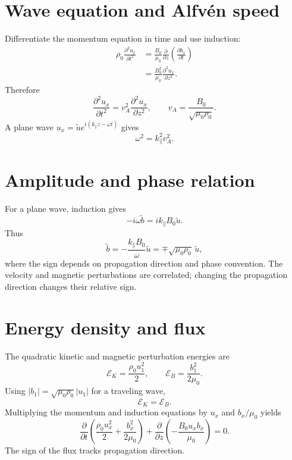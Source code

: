 \documentclass[11pt]{article}
\begin{document}
\section{Wave equation and Alfvén speed}

Differentiate the momentum equation in time and use induction:
\begin{align}
\rho_0\frac{\partial^2u_x}{\partial t^2}
&=\frac{B_0}{\mu_0}\frac{\partial}{\partial z}
\left(\frac{\partial b_x}{\partial t}\right)\\
&=\frac{B_0^2}{\mu_0}\frac{\partial^2u_x}{\partial z^2}.
\end{align}
Therefore
\begin{equation}
\boxed{\frac{\partial^2u_x}{\partial t^2}
=v_A^2\frac{\partial^2u_x}{\partial z^2}},
\qquad
\boxed{v_A=\frac{B_0}{\sqrt{\mu_0\rho_0}}}.
\end{equation}
A plane wave $u_x=\tilde u e^{i(k_\parallel z-\omega t)}$ gives
\begin{equation}
\boxed{\omega^2=k_\parallel^2v_A^2}.
\end{equation}


\section{Amplitude and phase relation}

For a plane wave, induction gives
\begin{equation}
-i\omega\tilde b=ik_\parallel B_0\tilde u.
\end{equation}
Thus
\begin{equation}
\tilde b=-\frac{k_\parallel B_0}{\omega}\tilde u
=\mp\sqrt{\mu_0\rho_0}\,\tilde u,
\end{equation}
where the sign depends on propagation direction and phase convention. The velocity and magnetic perturbations are correlated; changing the propagation direction changes their relative sign.


\section{Energy density and flux}

The quadratic kinetic and magnetic perturbation energies are
\begin{equation}
\mathcal E_K=\frac{\rho_0u_1^2}{2},\qquad
\mathcal E_B=\frac{b_1^2}{2\mu_0}.
\end{equation}
Using $|b_1|=\sqrt{\mu_0\rho_0}|u_1|$ for a traveling wave,
\begin{equation}
\boxed{\mathcal E_K=\mathcal E_B}.
\end{equation}
Multiplying the momentum and induction equations by $u_x$ and $b_x/\mu_0$ yields
\begin{equation}
\frac{\partial}{\partial t}\left(
\frac{\rho_0u_x^2}{2}+\frac{b_x^2}{2\mu_0}\right)
+\frac{\partial}{\partial z}\left(-\frac{B_0u_xb_x}{\mu_0}\right)=0.
\end{equation}
The sign of the flux tracks propagation direction.
\end{document}
